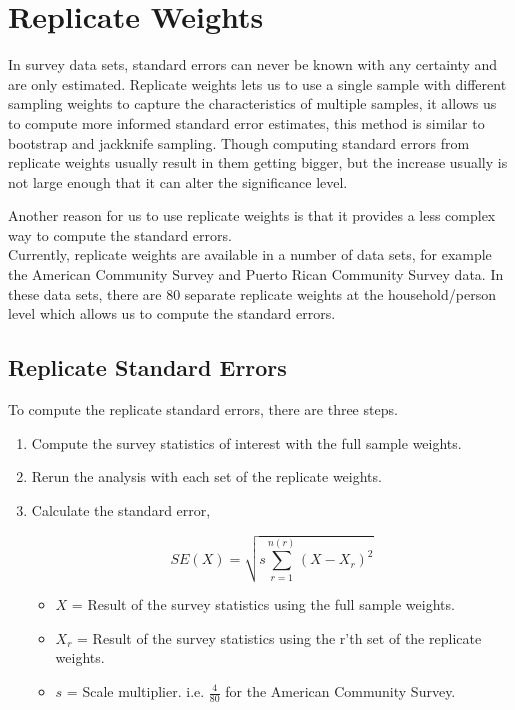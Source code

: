 
\newpage
\section{Replicate Weights}
In survey data sets, standard errors can never be known with any certainty and are only estimated. Replicate weights lets us to use a single sample with different sampling weights to capture the characteristics of multiple samples, it allows us to compute more informed standard error estimates, this method is similar to bootstrap and jackknife sampling. Though computing standard errors from replicate weights usually result in them getting bigger, but the increase usually is not large enough that it can alter the significance level. 

Another reason for us to use replicate weights is that it provides a less complex way to compute the standard errors. \\

Currently, replicate weights are available in a number of data sets, for example the American Community Survey and Puerto Rican Community Survey data. In these data sets, there are 80 separate replicate weights at the household/person level which allows us to compute the standard errors.

\subsection{Replicate Standard Errors}
To compute the replicate standard errors, there are three steps.
\begin{enumerate}
    \item Compute the survey statistics of interest with the full sample weights.
    
    \item Rerun the analysis with each set of the replicate weights.
    
    \item Calculate the standard error,
    
            $$ SE(X) = \sqrt{ s \sum_{r = 1}^{n(r)} (X - X_r)^2 }$$
                
            \begin{itemize}
                \item $X$ = Result of the survey statistics using the full sample weights.

                \item $X_r$ = Result of the survey statistics using the r'th set of the replicate weights. 

                \item $s$ = Scale multiplier. i.e. $\frac{4}{80}$ for the American Community Survey.
            \end{itemize}

\end{enumerate}


